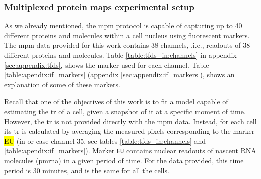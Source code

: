\subsubsection{Multiplexed protein maps experimental setup}

As we already mentioned, the \gls{mpm} protocol is capable of capturing up to 40 different proteins and molecules within a cell nucleus using fluorescent markers. The \gls{mpm} data provided for this work contains 38 channels, .i.e., readouts of 38 different proteins and molecules. Table \ref{table:tfds_in:channels} in appendix \ref{sec:appendix:tfds}, shows the marker used for each channel. Table \ref{table:apendix:if_markers} (appendix \ref{sec:appendix:if_markers}), shows an explanation of some of these markers.

Recall that one of the objectives of this work is to fit a model capable of estimating the \gls{tr} of a cell, given a snapshot of it at a specific moment of time.
However, the \gls{tr} is not provided directly with the \gls{mpm} data.
Instead, for each cell its \gls{tr} is calculated by averaging the measured pixels corresponding to the marker \hl{EU} (in or case channel 35, see tables \ref{table:tfds_in:channels} and \ref{table:apendix:if_markers}).
Marker \texttt{EU} contains nuclear readouts of nascent RNA molecules (\gls{pmrna}) in a given period of time. For the data provided, this time period is 30 minutes, and is the same for all the cells.
